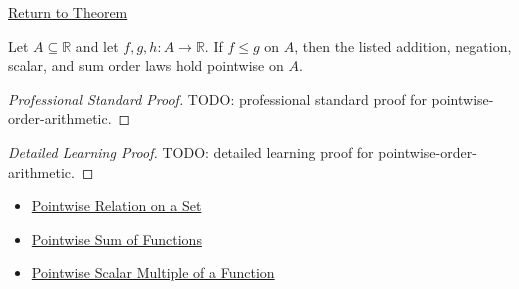 \newpage
{}
\label{prf:pointwise-order-arithmetic}

\begin{remark*}[Return]
\hyperref[thm:pointwise-order-arithmetic]{Return to Theorem}
\end{remark*}

\begin{theorem*}
Let \(A\subseteq\mathbb{R}\) and let \(f,g,h:A\to\mathbb{R}\).  If
\(f\leq g\) on \(A\), then the listed addition, negation, scalar, and sum
order laws hold pointwise on \(A\).
\end{theorem*}

\begin{proof}[Professional Standard Proof]
\LRAProofBodyStart
TODO: professional standard proof for pointwise-order-arithmetic.
\end{proof}

\begin{proof}[Detailed Learning Proof]
\LRAProofBodyStart
TODO: detailed learning proof for pointwise-order-arithmetic.
\end{proof}

\begin{remark*}
\end{remark*}

\begin{dependencies}
\begin{itemize}
  \item \hyperref[def:pointwise-relation-on-set]{Pointwise Relation on a Set}
  \item \hyperref[def:pointwise-sum-of-functions]{Pointwise Sum of Functions}
  \item \hyperref[def:pointwise-scalar-multiple-of-a-function]{Pointwise Scalar Multiple of a Function}
\end{itemize}
\end{dependencies}

\clearpage
